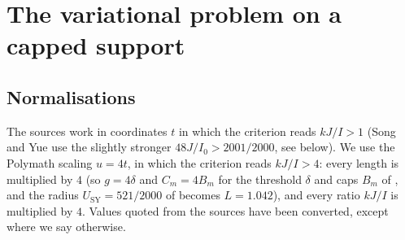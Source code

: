 \section{The variational problem on a capped support}

\subsection*{Normalisations}
The sources work in coordinates $t$ in which the criterion reads $kJ/I>1$
(Song and Yue use the slightly stronger $48J/I_0>2001/2000$, see below). We
use the Polymath scaling $u=4t$, in which the criterion reads $kJ/I>4$: every
length is multiplied by $4$ (so $g=4\delta$ and $C_m=4B_m$ for the threshold
$\delta$ and caps $B_m$ of \cite{Sta26}, and the radius $U_{\mathrm{SY}}=521/2000$
of \cite{SY26} becomes $L=1.042$), and every ratio $kJ/I$ is multiplied by
$4$. Values quoted from the sources have been converted, except where we say
otherwise.

